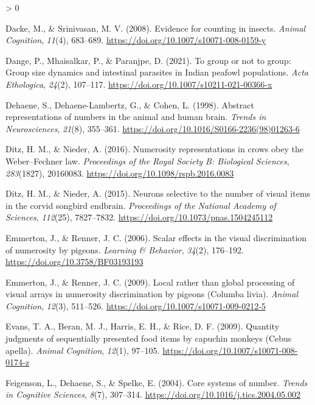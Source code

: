 \documentclass[
  english,
  ,doc,floatsintext]{apa6}
\newlength{\cslhangindent}
\newenvironment{CSLReferences}[2] %
 {%
  \setlength{\parindent}{0pt}
  \ifodd #1 \everypar{\setlength{\hangindent}{\cslhangindent}}\ignorespaces\fi
  \ifnum #2 > 0
  \setlength{\parskip}{#2\baselineskip}
  \fi
 }%
 {}
\begin{document}
\begin{CSLReferences}{1}{0}
\leavevmode\hypertarget{ref-Dacke.Srinivasan.2008}{}%
Dacke, M., \& Srinivasan, M. V. (2008). Evidence for counting in insects. \emph{Animal Cognition}, \emph{11}(4), 683--689. \url{https://doi.org/10.1007/s10071-008-0159-y}

\leavevmode\hypertarget{ref-Dange.etal.2021}{}%
Dange, P., Mhaisalkar, P., \& Paranjpe, D. (2021). To group or not to group: Group size dynamics and intestinal parasites in {Indian} peafowl populations. \emph{Acta Ethologica}, \emph{24}(2), 107--117. \url{https://doi.org/10.1007/s10211-021-00366-x}

\leavevmode\hypertarget{ref-Dehaene.etal.1998}{}%
Dehaene, S., Dehaene-Lambertz, G., \& Cohen, L. (1998). Abstract representations of numbers in the animal and human brain. \emph{Trends in Neurosciences}, \emph{21}(8), 355--361. \url{https://doi.org/10.1016/S0166-2236(98)01263-6}

\leavevmode\hypertarget{ref-Ditz.Nieder.2016}{}%
Ditz, H. M., \& Nieder, A. (2016). Numerosity representations in crows obey the {Weber}--{Fechner} law. \emph{Proceedings of the Royal Society B: Biological Sciences}, \emph{283}(1827), 20160083. \url{https://doi.org/10.1098/rspb.2016.0083}

\leavevmode\hypertarget{ref-Ditz.Nieder.2015}{}%
Ditz, H. M., \& Nieder, A. (2015). Neurons selective to the number of visual items in the corvid songbird endbrain. \emph{Proceedings of the National Academy of Sciences}, \emph{112}(25), 7827--7832. \url{https://doi.org/10.1073/pnas.1504245112}

\leavevmode\hypertarget{ref-Emmerton.Renner.2006}{}%
Emmerton, J., \& Renner, J. C. (2006). Scalar effects in the visual discrimination of numerosity by pigeons. \emph{Learning \& Behavior}, \emph{34}(2), 176--192. \url{https://doi.org/10.3758/BF03193193}

\leavevmode\hypertarget{ref-Emmerton.Renner.2009}{}%
Emmerton, J., \& Renner, J. C. (2009). Local rather than global processing of visual arrays in numerosity discrimination by pigeons ({Columba} livia). \emph{Animal Cognition}, \emph{12}(3), 511--526. \url{https://doi.org/10.1007/s10071-009-0212-5}

\leavevmode\hypertarget{ref-Evans.etal.2009}{}%
Evans, T. A., Beran, M. J., Harris, E. H., \& Rice, D. F. (2009). Quantity judgments of sequentially presented food items by capuchin monkeys ({Cebus} apella). \emph{Animal Cognition}, \emph{12}(1), 97--105. \url{https://doi.org/10.1007/s10071-008-0174-z}

\leavevmode\hypertarget{ref-Feigenson.etal.2004}{}%
Feigenson, L., Dehaene, S., \& Spelke, E. (2004). Core systems of number. \emph{Trends in Cognitive Sciences}, \emph{8}(7), 307--314. \url{https://doi.org/10.1016/j.tics.2004.05.002}


\end{CSLReferences}
\end{document}

